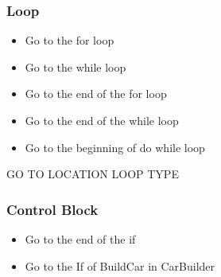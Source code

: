 \subsubsection{Loop}
\begin{itemize}
	\item Go to the for loop
	\item Go to the while loop
	\item Go to the end of the for loop
	\item Go to the end of the while loop
	\item Go to the beginning of do while loop
\end{itemize}
GO TO LOCATION LOOP TYPE
\subsubsection{Control Block}
\begin{itemize}
	\item Go to the end of the if
	\item Go to the If of BuildCar in CarBuilder
\end{itemize}
